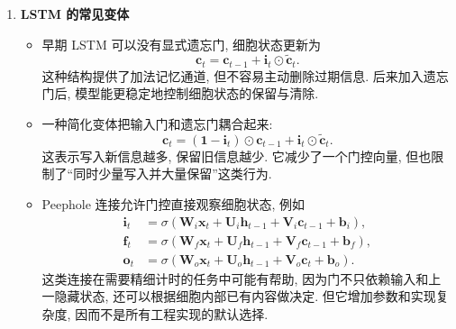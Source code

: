 \documentclass{../nndlcourse}
\begin{document}
\begin{enumerate}
\item \textbf{LSTM 的常见变体}
  \begin{itemize}
    \item 早期 LSTM 可以没有显式遗忘门, 细胞状态更新为
    \begin{equation*}
      \boldsymbol{c}_t
      = \boldsymbol{c}_{t-1}
      + \boldsymbol{i}_t\odot\tilde{\boldsymbol{c}}_t.
    \end{equation*}
    这种结构提供了加法记忆通道, 但不容易主动删除过期信息. 后来加入遗忘门后, 模型能更稳定地控制细胞状态的保留与清除.
    \item 一种简化变体把输入门和遗忘门耦合起来:
    \begin{equation*}
      \boldsymbol{c}_t
      = (\mathbf{1}-\boldsymbol{i}_t)\odot\boldsymbol{c}_{t-1}
      + \boldsymbol{i}_t\odot\tilde{\boldsymbol{c}}_t.
    \end{equation*}
    这表示写入新信息越多, 保留旧信息越少. 它减少了一个门控向量, 但也限制了“同时少量写入并大量保留”这类行为.
    \item Peephole 连接允许门控直接观察细胞状态, 例如
    \begin{align*}
      \boldsymbol{i}_t
      &= \sigma\left(\boldsymbol{W}_i\boldsymbol{x}_t
        + \boldsymbol{U}_i\boldsymbol{h}_{t-1}
        + \boldsymbol{V}_i\boldsymbol{c}_{t-1}
        + \boldsymbol{b}_i\right), \\
      \boldsymbol{f}_t
      &= \sigma\left(\boldsymbol{W}_f\boldsymbol{x}_t
        + \boldsymbol{U}_f\boldsymbol{h}_{t-1}
        + \boldsymbol{V}_f\boldsymbol{c}_{t-1}
        + \boldsymbol{b}_f\right), \\
      \boldsymbol{o}_t
      &= \sigma\left(\boldsymbol{W}_o\boldsymbol{x}_t
        + \boldsymbol{U}_o\boldsymbol{h}_{t-1}
        + \boldsymbol{V}_o\boldsymbol{c}_{t}
        + \boldsymbol{b}_o\right).
    \end{align*}
    这类连接在需要精细计时的任务中可能有帮助, 因为门不只依赖输入和上一隐藏状态, 还可以根据细胞内部已有内容做决定. 但它增加参数和实现复杂度, 因而不是所有工程实现的默认选择.
  \end{itemize}


\end{enumerate}
\end{document}

